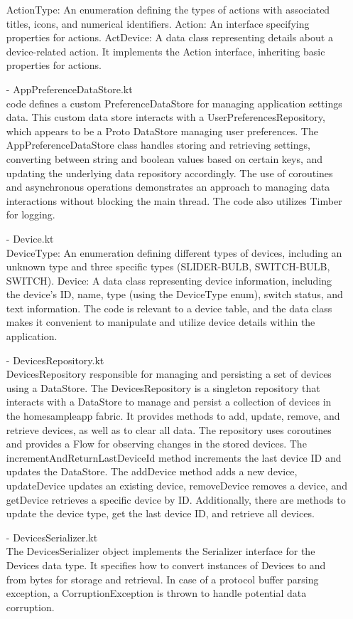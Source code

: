 \begin{enumerate}
            ActionType: An enumeration defining the types of actions with associated titles, icons, and numerical identifiers.
            Action: An interface specifying properties for actions.
            ActDevice: A data class representing details about a device-related action. It implements the Action interface, inheriting basic properties for actions.\\
      \item[-] AppPreferenceDataStore.kt\\
            code defines a custom PreferenceDataStore for managing application settings data. This custom data store interacts with a UserPreferencesRepository, which appears to be a Proto DataStore managing user preferences. The AppPreferenceDataStore class handles storing and retrieving settings, converting between string and boolean values based on certain keys, and updating the underlying data repository accordingly.
            The use of coroutines and asynchronous operations demonstrates an approach to managing data interactions without blocking the main thread. The code also utilizes Timber for logging.\\
      \item[-] Device.kt\\
            DeviceType: An enumeration defining different types of devices, including an unknown type and three specific types (SLIDER-BULB, SWITCH-BULB, SWITCH).
            Device: A data class representing device information, including the device's ID, name, type (using the DeviceType enum), switch status, and text information.
            The code is relevant to a device table, and the data class makes it convenient to manipulate and utilize device details within the application.\\
      \item[-] DevicesRepository.kt\\
            DevicesRepository responsible for managing and persisting a set of devices using a DataStore.
            The DevicesRepository is a singleton repository that interacts with a DataStore to manage and persist a collection of devices in the homesampleapp fabric. It provides methods to add, update, remove, and retrieve devices, as well as to clear all data. The repository uses coroutines and provides a Flow for observing changes in the stored devices.
            The incrementAndReturnLastDeviceId method increments the last device ID and updates the DataStore. The addDevice method adds a new device, updateDevice updates an existing device, removeDevice removes a device, and getDevice retrieves a specific device by ID. Additionally, there are methods to update the device type, get the last device ID, and retrieve all devices.\\
      \item[-] DevicesSerializer.kt\\
            The DevicesSerializer object implements the Serializer interface for the Devices data type. It specifies how to convert instances of Devices to and from bytes for storage and retrieval. In case of a protocol buffer parsing exception, a CorruptionException is thrown to handle potential data corruption.


\end{enumerate}
